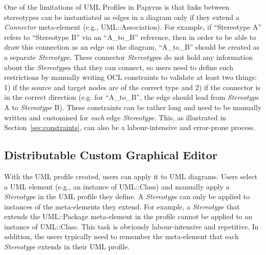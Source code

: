 One of the limitations of UML Profiles in Papyrus is that links between stereotypes can be instantiated as edges in a diagram only if they extend a \textit{Connector} meta-element (e.g., UML::Association).  
For example, if ``Stereotype A'' refers to ``Stereotype B'' via an ``A\_to\_B'' reference, then in order to be able to draw this connection as an edge on the diagram, ``A\_to\_B'' should be created as a separate \textit{Stereotype}. 
These connector \textit{Stereotype}s do not hold any information about the \textit{Stereotype}s that they can connect, so users need to define such restrictions by manually writing OCL constraints to validate at least two things: 1) if the source and target nodes are of the correct type and 2) if the connector is in the correct direction (e.g. for ``A\_to\_B'', the edge should lead from \textit{Stereotype} A to \textit{Stereotype} B). 
These constraints can be rather long and need to be manually written and customised for \textit{each} edge \textit{Stereotype}. This, as illustrated in Section~\ref{sec:constraints}, can also be a labour-intensive and error-prone process.

\subsection{Distributable Custom Graphical Editor}
With the UML profile created, users can apply it to UML diagrams. 
Users select a UML element (e.g., an instance of UML::Class) and manually apply a \textit{Stereotype} in the UML profile they define. 
A \textit{Stereotype} can only be applied to instances of the meta-elements they extend.
For example, a \textit{Stereotype} that extends the UML::Package meta-element in the profile cannot be applied to an instance of UML::Class. 
This task is obviously labour-intensive and repetitive. 
In addition, the users typically need to remember the meta-element that each \textit{Stereotype} extends in their UML profile. 

